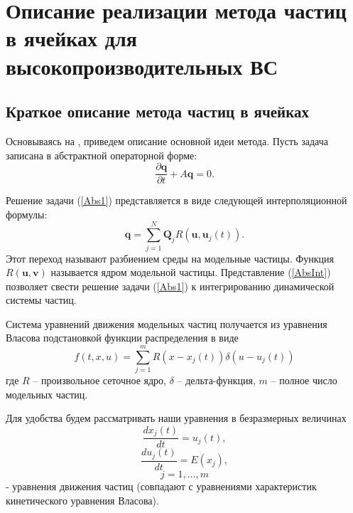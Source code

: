 \chapter{Описание реализации метода частиц в ячейках для высокопроизводительных ВС}
\label{chapt1}

\section{Краткое описание метода частиц в ячейках}
\label{beam-plasma-methods}


Основываясь на
\cite{VshivkovPICbook}, приведем описание основной идеи метода. Пусть задача записана 
в абстрактной операторной форме:
\begin{equation}
\label{Abs1}
\frac{\partial \textbf{q}}{\partial t} + A\textbf{q} = 0.
\end{equation}

Решение задачи (\ref{Abs1}) представляется в виде следующей интерполяционной 
формулы:
\begin{equation}
\label{AbsInt}
\textbf{q} = \sum\limits^{N}_{j=1}\textbf{Q}_j R(\textbf{u},\textbf{u}_j(t)).
\end{equation}
Этот переход называют разбиением среды на модельные частицы. Функция 
$R(\textbf{u},\textbf{v})$ называется ядром модельной частицы. Представление
(\ref{AbsInt}) позволяет свести решение задачи 
(\ref{Abs1}) к интегрированию динамической системы частиц.


\quad Система уравнений движения модельных частиц получается
\cite{VshivkovPICbook} из уравнения Власова подстановкой функции
распределения в виде
\begin{equation}\label{fr}
f(t,x,u)=\sum_{j=1}^m R(x-x_j(t))\delta(u-u_j(t))
\end{equation}
где $R$ -- произвольное сеточное ядро,  %
$\delta$ -- дельта-функция, $m$ -- полное число модельных частиц.

Для удобства будем рассматривать наши уравнения в безразмерных
величинах
\begin{equation}\label{dx}
\frac{dx_j(t)}{dt}=u_j(t),
\end{equation}
\begin{equation}\label{du}
\frac{du_j(t)}{dt}=E(x_j),
\end{equation}
\begin{displaymath}
j=1,\ldots, m
\end{displaymath}
- уравнения движения частиц (совпадают с уравнениями характеристик
кинетического уравнения Власова).

